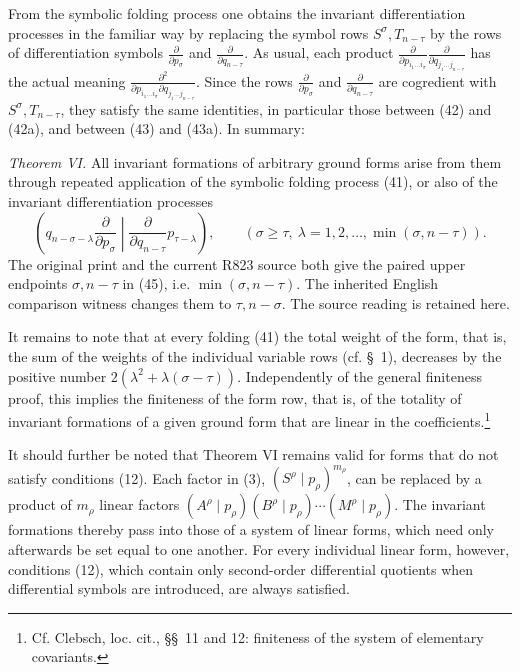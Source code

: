 \documentclass[10pt]{article}
\newcommand{\pair}[2]{(#1\mid #2)}
\begin{document}
From the symbolic folding process one obtains the invariant differentiation
processes in the familiar way by replacing the symbol rows
$S^\sigma,T_{n-\tau}$ by the rows of differentiation symbols
$\frac{\partial}{\partial p_\sigma}$ and
$\frac{\partial}{\partial q_{n-\tau}}$. As usual, each product
$\frac{\partial}{\partial p_{i_1\ldots i_\sigma}}
 \frac{\partial}{\partial q_{j_1\ldots j_{n-\tau}}}$ has the actual meaning
$\frac{\partial^2}{\partial p_{i_1\ldots i_\sigma}
 \partial q_{j_1\ldots j_{n-\tau}}}$. Since the rows
$\frac{\partial}{\partial p_\sigma}$ and
$\frac{\partial}{\partial q_{n-\tau}}$ are cogredient with
$S^\sigma,T_{n-\tau}$, they satisfy the same identities, in particular those
between (42) and (42a), and between (43) and (43a). In summary:

\emph{Theorem VI.} All invariant formations of arbitrary ground forms arise
from them through repeated application of the symbolic folding process (41),
or also of the invariant differentiation processes
\begin{equation}
 \left(q_{n-\sigma-\lambda}\frac{\partial}{\partial p_\sigma}
 \middle|\frac{\partial}{\partial q_{n-\tau}}p_{\tau-\lambda}\right),
 \qquad(\sigma\geq\tau,\ \lambda=1,2,\ldots,
 \min(\sigma,n-\tau)).
\tag{45}
\end{equation}
The original print and the current R823 source both give the
paired upper endpoints $\sigma,n-\tau$ in (45), i.e.
$\min(\sigma,n-\tau)$. The inherited English comparison witness changes them
to $\tau,n-\sigma$. The source reading is retained here.

It remains to note that at every folding (41) the total weight of the form,
that is, the sum of the weights of the individual variable rows (cf. \S\ 1),
decreases by the positive number
$2(\lambda^2+\lambda(\sigma-\tau))$. Independently of the general finiteness
proof, this implies the finiteness of the form row, that is, of the totality
of invariant formations of a given ground form that are linear in the
coefficients.\footnote{Cf. Clebsch, loc. cit., \S\S\ 11 and 12: finiteness
of the system of elementary covariants.}

It should further be noted that Theorem VI remains valid for forms that do
not satisfy conditions (12). Each factor in (3),
$\pair{S^\rho}{p_\rho}^{m_\rho}$, can be replaced by a product of $m_\rho$
linear factors
$\pair{A^\rho}{p_\rho}\pair{B^\rho}{p_\rho}\cdots
\pair{M^\rho}{p_\rho}$. The invariant formations thereby pass into those of
a system of linear forms, which need only afterwards be set equal to one
another. For every individual linear form, however, conditions (12), which
contain only second-order differential quotients when differential symbols
are introduced, are always satisfied.
\end{document}
